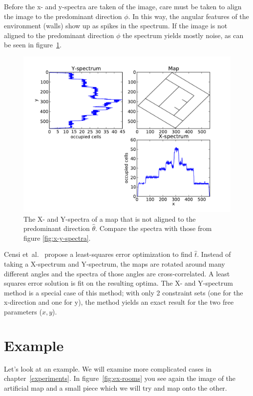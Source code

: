 Before the x- and y-spectra are taken of the image, care must be taken to align the image to the predominant direction $\phi$. In this way, the angular features of the environment (walls) show up as spikes in the spectrum. If the image is not aligned to the predominant direction $\phi$ the spectrum yields mostly noise, as can be seen in figure~\ref{fig:x-y-spectra-noise}.

\begin{figure}[ht]
	\centering
	\includegraphics[width=\textwidth]{images/stitching/rooms-rotated-full-xy.pdf}
	\caption{The X- and Y-spectra of a map that is not aligned to the predominant direction $\hat\theta$. Compare the spectra with those from figure \ref{fig:x-y-spectra}.}
	\label{fig:x-y-spectra-noise}
\end{figure}

Censi et~al.\ \cite{censi2005scan} propose a least-squares error optimization to find $\hat t$. Instead of taking a X-spectrum and Y-spectrum, the maps are rotated around many different angles and the spectra of those angles are cross-correlated. A least squares error solution is fit on the resulting optima. The X- and Y-spectrum method is a special case of this method; with only 2 constraint sets (one for the x-direction and one for y), the method yields an exact result for the two free parameters ($x, y$).

\section{Example}
Let's look at an example. We will examine more complicated cases in chapter~\ref{experiments}. In figure~\ref{fig:ex-rooms} you see again the image of the artificial map and a small piece which we will try and map onto the other. 

